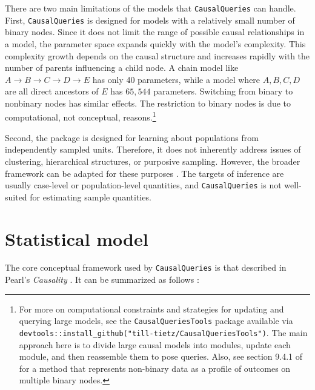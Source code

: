\documentclass[
  11pt,
  article]{jss}
\begin{document}
There are two main limitations of the models that \texttt{CausalQueries}
can handle. First, \texttt{CausalQueries} is designed for models with a
relatively small number of binary nodes. Since it does not limit the
range of possible causal relationships in a model, the parameter space
expands quickly with the model's complexity. This complexity growth
depends on the causal structure and increases rapidly with the number of
parents influencing a child node. A chain model like
\(A \rightarrow B \rightarrow C \rightarrow D \rightarrow E\) has only
40 parameters, while a model where \(A, B, C, D\) are all direct
ancestors of \(E\) has \(65,544\) parameters. Switching from binary to
nonbinary nodes has similar effects. The restriction to binary nodes is
due to computational, not conceptual, reasons.\footnote{For more on
  computational constraints and strategies for updating and querying
  large models, see the \texttt{CausalQueriesTools} package available
  via
  \texttt{devtools::install\_github("till-tietz/CausalQueriesTools")}.
  The main approach here is to divide large causal models into modules,
  update each module, and then reassemble them to pose queries. Also,
  see section 9.4.1 of \citet{humphreys_integrated_2023} for a method
  that represents non-binary data as a profile of outcomes on multiple
  binary nodes.}

Second, the package is designed for learning about populations from
independently sampled units. Therefore, it does not inherently address
issues of clustering, hierarchical structures, or purposive sampling.
However, the broader framework can be adapted for these purposes
\citep[see section 9.4 of][]{humphreys_integrated_2023}. The targets of
inference are usually case-level or population-level quantities, and
\texttt{CausalQueries} is not well-suited for estimating sample
quantities.

\section{Statistical model}\label{sec-theory}

The core conceptual framework used by \texttt{CausalQueries} is that
described in Pearl's \emph{Causality} \citep{pearl_causality_2009}. It
can be summarized as follows \citep[using notation
from][]{humphreys_integrated_2023}:
\end{document}

